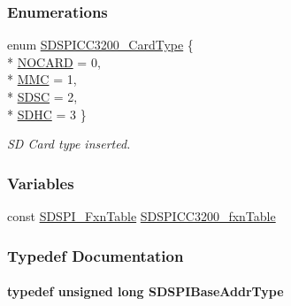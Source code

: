 \subsubsection*{Enumerations}
\begin{DoxyCompactItemize}
\item 
enum \hyperlink{_s_d_s_p_i_c_c3200_8h_aef9c37db8744ba414b93ef56c1473be7}{S\+D\+S\+P\+I\+C\+C3200\+\_\+\+Card\+Type} \{ \\*
\hyperlink{_s_d_s_p_i_c_c3200_8h_aef9c37db8744ba414b93ef56c1473be7a422cdc20ba86c8cdcf1f0fd2318a1cfc}{N\+O\+C\+A\+R\+D} = 0, 
\\*
\hyperlink{_s_d_s_p_i_c_c3200_8h_aef9c37db8744ba414b93ef56c1473be7aa7d8fca3406f36682514f0384d910fac}{M\+M\+C} = 1, 
\\*
\hyperlink{_s_d_s_p_i_c_c3200_8h_aef9c37db8744ba414b93ef56c1473be7a87550a2102744c14e5e2e0ed39cc04b2}{S\+D\+S\+C} = 2, 
\\*
\hyperlink{_s_d_s_p_i_c_c3200_8h_aef9c37db8744ba414b93ef56c1473be7ab27db2a19a825c3e6f1513cdab7c81ea}{S\+D\+H\+C} = 3
 \}
\begin{DoxyCompactList}\small\item\em S\+D Card type inserted. \end{DoxyCompactList}\end{DoxyCompactItemize}
\subsubsection*{Variables}
\begin{DoxyCompactItemize}
\item 
const \hyperlink{struct_s_d_s_p_i___fxn_table}{S\+D\+S\+P\+I\+\_\+\+Fxn\+Table} \hyperlink{_s_d_s_p_i_c_c3200_8h_af1a91900fe6e8604a690894b04bbbc7a}{S\+D\+S\+P\+I\+C\+C3200\+\_\+fxn\+Table}
\end{DoxyCompactItemize}


\subsubsection{Typedef Documentation}
\paragraph[{S\+D\+S\+P\+I\+Base\+Addr\+Type}]{\setlength{\rightskip}{0pt plus 5cm}typedef unsigned long {\bf S\+D\+S\+P\+I\+Base\+Addr\+Type}}\label{_s_d_s_p_i_c_c3200_8h_ad2ee2f6fbdb79c0577161ae92a7f1650}
